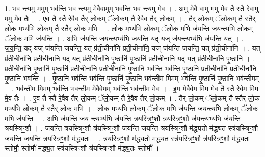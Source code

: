 \documentclass[17pt]{extarticle}
\begin{document}
1. भव॑ न्त्य॒मु म॒मुम् भव॑न्ति॒ भव॑ न्त्य॒मु मे॒वैवामुम् भव॑न्ति॒ भव॑ न्त्य॒मु मे॒व । . अ॒मु मे॒वै वामु म॒मु मे॒व तै स्तै रे॒वामु म॒मु मे॒व तैः । . ए॒व तै स्तै रे॒वैव तैर् लो॒कम् ॅलो॒कम् तै रे॒वैव तैर् लो॒कम् । . तैर् लो॒कम् ॅलो॒कम् तै स्तैर् लो॒क म॒भ्य॑भि लो॒कम् तै स्तैर् लो॒क म॒भि । . लो॒क म॒भ्य॑भि लो॒कम् ॅलो॒क म॒भि ज॑यन्ति जयन्त्य॒भि लो॒कम् ॅलो॒क म॒भि ज॑यन्ति । . अ॒भि ज॑यन्ति जयन्त्य॒भ्य॑भि ज॑यन्ति॒ यद् यज् ज॑यन्त्य॒भ्य॑भि ज॑यन्ति॒ यत् । . ज॒य॒न्ति॒ यद् यज् ज॑यन्ति जयन्ति॒ यत् प्र॑ती॒चीना॑नि प्रती॒चीना॑नि॒ यज् ज॑यन्ति जयन्ति॒ यत् प्र॑ती॒चीना॑नि । . यत् प्र॑ती॒चीना॑नि प्रती॒चीना॑नि॒ यद् यत् प्र॑ती॒चीना॑नि पृ॒ष्ठानि॑ पृ॒ष्ठानि॑ प्रती॒चीना॑नि॒ यद् यत् प्र॑ती॒चीना॑नि पृ॒ष्ठानि॑ । . प्र॒ती॒चीना॑नि पृ॒ष्ठानि॑ पृ॒ष्ठानि॑ प्रती॒चीना॑नि प्रती॒चीना॑नि पृ॒ष्ठानि॒ भव॑न्ति॒ भव॑न्ति पृ॒ष्ठानि॑ प्रती॒चीना॑नि प्रती॒चीना॑नि पृ॒ष्ठानि॒ भव॑न्ति । . पृ॒ष्ठानि॒ भव॑न्ति॒ भव॑न्ति पृ॒ष्ठानि॑ पृ॒ष्ठानि॒ भव॑न्ती॒म मि॒मम् भव॑न्ति पृ॒ष्ठानि॑ पृ॒ष्ठानि॒ भव॑न्ती॒मम् । . भव॑न्ती॒म मि॒मम् भव॑न्ति॒ भव॑न्ती॒म मे॒वैवेमम् भव॑न्ति॒ भव॑न्ती॒म मे॒व । . इ॒म मे॒वैवेम मि॒म मे॒व तै स्तै रे॒वेम मि॒म मे॒व तैः । . ए॒व तै स्तै रे॒वैव तैर् लो॒कम् ॅलो॒कम् तै रे॒वैव तैर् लो॒कम् । . तैर् लो॒कम् ॅलो॒कम् तै स्तैर् लो॒क म॒भ्य॑भि लो॒कम् तै स्तैर् लो॒क म॒भि । . लो॒क म॒भ्य॑भि लो॒कम् ॅलो॒क म॒भि ज॑यन्ति जयन्त्य॒भि लो॒कम् ॅलो॒क म॒भि ज॑यन्ति । . अ॒भि ज॑यन्ति जय न्त्य॒भ्य॑भि ज॑यन्ति त्रयस्त्रिꣳ॒॒शौ त्र॑यस्त्रिꣳ॒॒शौ ज॑यन्त्य॒भ्य॑भि ज॑यन्ति त्रयस्त्रिꣳ॒॒शौ । . ज॒य॒न्ति॒ त्र॒य॒स्त्रिꣳ॒॒शौ त्र॑यस्त्रिꣳ॒॒शौ ज॑यन्ति जयन्ति त्रयस्त्रिꣳ॒॒शौ म॑द्ध्य॒तो म॑द्ध्य॒त स्त्र॑यस्त्रिꣳ॒॒शौ ज॑यन्ति जयन्ति त्रयस्त्रिꣳ॒॒शौ म॑द्ध्य॒तः । . त्र॒य॒स्त्रिꣳ॒॒शौ म॑द्ध्य॒तो म॑द्ध्य॒त स्त्र॑यस्त्रिꣳ॒॒शौ त्र॑यस्त्रिꣳ॒॒शौ म॑द्ध्य॒तः स्तोमौ॒ स्तोमौ॑ मद्ध्य॒त स्त्र॑यस्त्रिꣳ॒॒शौ त्र॑यस्त्रिꣳ॒॒शौ म॑द्ध्य॒तः स्तोमौ᳚ । \newline
\end{document}
